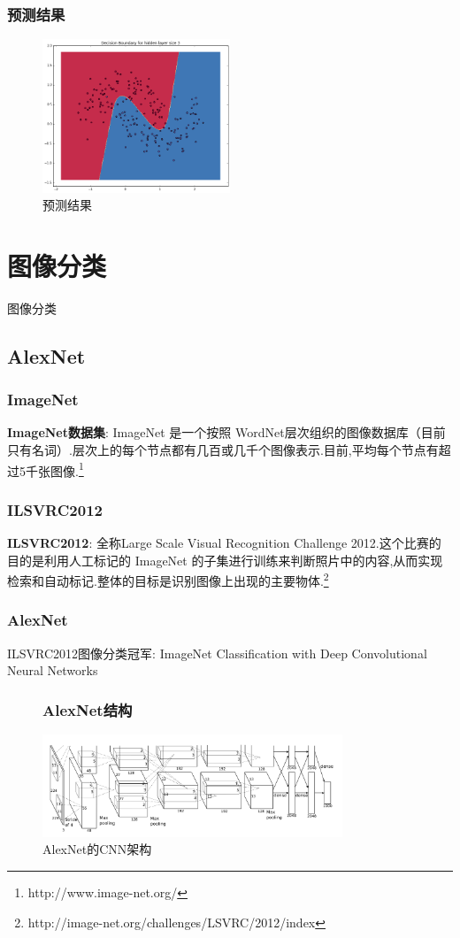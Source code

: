\documentclass[table]{beamer}
\begin{document}
\begin{frame}
	\frametitle{预测结果}
	\begin{figure}
		\includegraphics[width=0.5\textwidth]{result.png}
		\caption{预测结果}
		\label{fig:result}
	\end{figure}
\end{frame}

\section{图像分类}
\begin{frame}
	\begin{center}
		\vspace{0.1cm}
		\Huge{图像分类}
	\end{center}
\end{frame}

\subsection{AlexNet}
\begin{frame}
	\frametitle{ImageNet}
	\textbf{ImageNet数据集}: ImageNet 是一个按照 WordNet层次组织的图像数据库（目前只有名词）.层次上的每个节点都有几百或几千个图像表示.目前,平均每个节点有超过5千张图像.\footnote{\label{ft:imagenet}http://www.image-net.org/}
\end{frame}
\begin{frame}
	\frametitle{ILSVRC2012}
	\textbf{ILSVRC2012}: 全称Large Scale Visual Recognition Challenge 2012.这个比赛的目的是利用人工标记的 ImageNet 的子集进行训练来判断照片中的内容,从而实现检索和自动标记.整体的目标是识别图像上出现的主要物体.\footnote{\label{ft:ilsvrc}http://image-net.org/challenges/LSVRC/2012/index}
\end{frame}
\begin{frame}
	\frametitle{AlexNet}
	ILSVRC2012图像分类冠军: ImageNet Classiﬁcation with Deep Convolutional Neural Networks\autocite{krizhevsky2012imagenet}
\end{frame}
\begin{frame}
\begin{figure}
	\frametitle{AlexNet结构}
	\includegraphics[width=0.8\textwidth]{AlexNet.png}
	\caption{AlexNet的CNN架构}
	\label{fig:alexnet}
\end{figure}
\end{frame}
\end{document}
